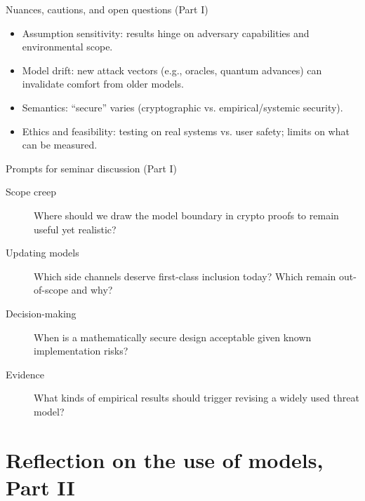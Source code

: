 \documentclass[11pt]{article}
\begin{document}
\begin{frame}{Nuances, cautions, and open questions (Part I)}
  \begin{itemize}
    \item Assumption sensitivity: results hinge on adversary capabilities and environmental scope.
    \item Model drift: new attack vectors (e.g., oracles, quantum advances) can invalidate comfort from older models.
    \item Semantics: \enquote{secure} varies (cryptographic vs. empirical/systemic security).
    \item Ethics and feasibility: testing on real systems vs. user safety; limits on what can be measured.
  \end{itemize}
\end{frame}

\begin{frame}{Prompts for seminar discussion (Part I)}
  \begin{description}
    \item[Scope creep] Where should we draw the model boundary in crypto proofs to remain useful yet realistic?
    \item[Updating models] Which side channels deserve first-class inclusion today? Which remain out-of-scope and why?
    \item[Decision-making] When is a mathematically secure design acceptable given known implementation risks?
    \item[Evidence] What kinds of empirical results should trigger revising a widely used threat model?
  \end{description}
\end{frame}

\section{Reflection on the use of models, Part II}
\end{document}
